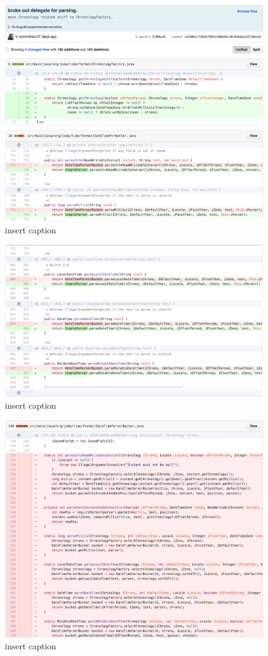 \begin{figure}[H]
	\centering
	\includegraphics[width=\linewidth]{code67}
	\caption{insert caption}
\end{figure}
\begin{figure}[H]
	\centering
	\includegraphics[width=\linewidth]{code68}
	\caption{insert caption}
\end{figure}
\begin{figure}[H]
	\centering
	\includegraphics[width=\linewidth]{code69}
	\caption{insert caption}
\end{figure}

